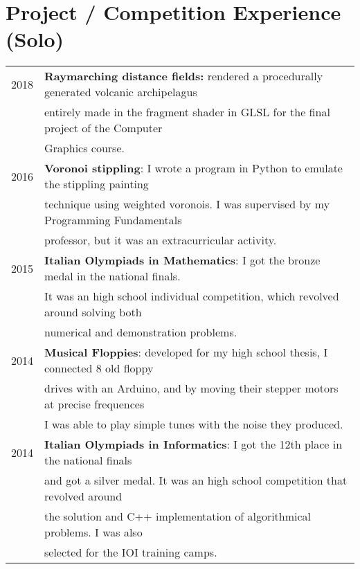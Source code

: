 \documentclass[a4paper,10pt]{article} %
\begin{document}
\section{Project / Competition Experience (Solo)}
\begin{tabular}{rl}
2018 &  \textbf{Raymarching distance fields:} rendered a procedurally generated volcanic archipelagus \\
     & entirely made in the fragment shader in GLSL for the final project of the Computer \\
     & Graphics course.  \\
2016 &  \textbf{Voronoi stippling}: I wrote a program in Python to emulate the stippling painting \\
     & technique using weighted voronois. I was supervised by my Programming Fundamentals \\
     & professor, but it was an extracurricular activity. \\
2015 &  \textbf{Italian Olympiads in Mathematics}: I got the bronze medal in the national finals. \\
     & It was an high school individual competition, which revolved around solving both \\
     & numerical and demonstration problems. \\
2014 &  \textbf{Musical Floppies}: developed for my high school thesis, I connected 8 old floppy \\
     & drives with an Arduino, and by moving their stepper motors at precise frequences \\
     & I was able to play simple tunes with the noise they produced.\\
2014 &  \textbf{Italian Olympiads in Informatics}: I got the 12th place in the national finals \\
     & and got a silver medal. It was an high school competition that revolved around \\
     & the solution and C++ implementation of algorithmical problems. I was also \\
     & selected for the IOI training camps. \\
\end{tabular}

\end{document}
